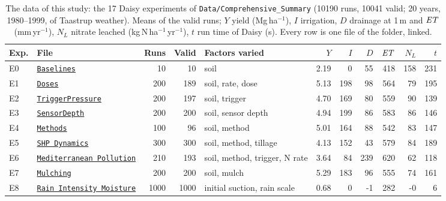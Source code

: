 \begin{table}[H]\centering\scriptsize
\caption{The data of this study: the 17 Daisy experiments of \texttt{Data/Comprehensive\_Summary} (10190 runs, 10041 valid; 20 years, 1980--1999, of Taastrup weather). Means of the valid runs; $Y$ yield (Mg\,ha$^{-1}$), $I$ irrigation, $D$ drainage at 1\,m and $\mathit{ET}$ (mm\,yr$^{-1}$), $N_L$ nitrate leached (kg\,N\,ha$^{-1}$\,yr$^{-1}$), $t$ run time of Daisy (s). Every row is one file of the folder, linked.}
\label{tab:data}
\setlength{\tabcolsep}{3pt}
\begin{tabular}{@{}llrrp{3.5cm}rrrrrr@{}}
\toprule
Exp. & File & Runs & Valid & Factors varied & $Y$ & $I$ & $D$ & $\mathit{ET}$ & $N_L$ & $t$\\\midrule
E0 & \href{\repourl/blob/main/Data/Comprehensive_Summary/E00_Baselines.csv.gz}{\texttt{Baselines}} & 10 & 10 & soil & 2.19 & 0 & 55 & 418 & 158 & 231\\
E1 & \href{\repourl/blob/main/Data/Comprehensive_Summary/E01_Doses.csv.gz}{\texttt{Doses}} & 200 & 189 & soil, rate, dose & 5.13 & 198 & 98 & 564 & 79 & 195\\
E2 & \href{\repourl/blob/main/Data/Comprehensive_Summary/E02_TriggerPressure.csv.gz}{\texttt{TriggerPressure}} & 200 & 197 & soil, trigger & 4.70 & 169 & 80 & 559 & 90 & 139\\
E3 & \href{\repourl/blob/main/Data/Comprehensive_Summary/E03_SensorDepth.csv.gz}{\texttt{SensorDepth}} & 200 & 200 & soil, sensor depth & 4.94 & 199 & 86 & 583 & 86 & 146\\
E4 & \href{\repourl/blob/main/Data/Comprehensive_Summary/E04_Methods.csv.gz}{\texttt{Methods}} & 100 & 96 & soil, method & 5.01 & 164 & 88 & 542 & 83 & 147\\
E5 & \href{\repourl/blob/main/Data/Comprehensive_Summary/E05_SHP_Dynamics.csv.gz}{\texttt{SHP Dynamics}} & 300 & 300 & soil, method, tillage & 4.13 & 152 & 43 & 579 & 84 & 189\\
E6 & \href{\repourl/blob/main/Data/Comprehensive_Summary/E06_Mediterranean_Pollution.csv.gz}{\texttt{Mediterranean Pollution}} & 210 & 193 & soil, method, trigger, N rate & 3.64 & 84 & 239 & 620 & 62 & 118\\
E7 & \href{\repourl/blob/main/Data/Comprehensive_Summary/E07_Mulching.csv.gz}{\texttt{Mulching}} & 200 & 200 & soil, mulch & 5.29 & 183 & 96 & 555 & 74 & 161\\
E8 & \href{\repourl/blob/main/Data/Comprehensive_Summary/E08_Rain_Intensity_Moisture.csv.gz}{\texttt{Rain Intensity Moisture}} & 1000 & 1000 & initial suction, rain scale & 0.68 & 0 & -1 & 282 & -0 & 6\\

\end{tabular}
\end{table}
